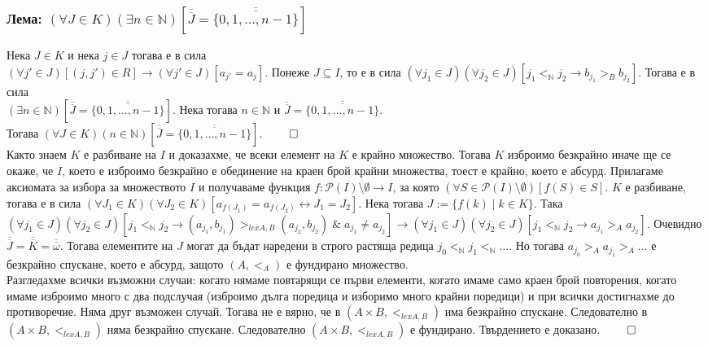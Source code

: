 \documentclass[a4paper, 12pt, oneside]{article}
\begin{document}
\subsubsection*{Лема: \((\forall J \in K)(\exists n \in \mathbb{N})[\overline{\overline{J}} = \overline{\overline{\{0, 1, \dots, n - 1\}}}]\)}
Нека \(J \in K\) и нека \(j \in J\) тогава е в сила \\
\((\forall j' \in J)[(j, j') \in R] \longrightarrow (\forall j' \in J)[a_{j'} = a_j]\).
Понеже \(J \subseteq I\), то е в сила \((\forall j_1 \in J)(\forall j_2 \in J)[j_1 <_{\mathbb{N}} j_2 \longrightarrow b_{j_1} >_B b_{j_2}]\). Тогава е в сила \\
\((\exists n \in \mathbb{N})[\overline{\overline{J}} = \overline{\overline{\{0, 1, \dots, n - 1\}}}]\).
Нека тогава \(n \in \mathbb{N}\) и \(\overline{\overline{J}} = \overline{\overline{\{0, 1, \dots, n - 1\}}}\). \\
Тогава \((\forall J \in K)(n \in \mathbb{N})[\overline{\overline{J}} = \overline{\overline{\{0, 1, \dots, n - 1\}}}]\). \(\qed\) \\
Както знаем \(K\) е разбиване на \(I\) и доказахме, че всеки елемент на \(K\) е крайно множество.
Тогава \(K\) изброимо безкрайно иначе ще се окаже, че \(I\), което е изброимо безкрайно е обединение на краен брой крайни множества, тоест е крайно, което е абсурд.
Прилагаме аксиомата за избора за множеството \(I\) и получаваме функция \(f : \mathcal{P}(I)\setminus\emptyset \to I\),
за която \((\forall S \in \mathcal{P}(I)\setminus\emptyset)[f(S) \in S]\).
\(K\) е разбиване, тогава е в сила \((\forall J_1 \in K)(\forall J_2 \in K)[a_{f(J_1)} = a_{f(J_2)} \longleftrightarrow J_1 = J_2]\).
Нека тогава \(J := \{f(k) \; | \; k \in K\}\).
Така \((\forall j_1 \in J)(\forall j_2 \in J)[j_1 <_{\mathbb{N}} j_2 \longrightarrow (a_{j_1}, b_{j_1}) >_{lex A, B} (a_{j_2}, b_{j_2}) \; \& \; a_{j_1} \neq a_{j_2}] \longrightarrow
(\forall j_1 \in J)(\forall j_2 \in J)[j_1 <_{\mathbb{N}} j_2 \longrightarrow a_{j_1} >_A a_{j_2}]\).
Очевидно \(\overline{\overline{J}} = \overline{\overline{K}} = \overline{\overline{\omega}}\).
Тогава елементите на \(J\) могат да бъдат наредени в строго растяща редица \(j_0 <_{\mathbb{N}} j_1  <_{\mathbb{N}} \dots\).
Но тогава \(a_{j_0} >_A a_{j_1} >_A \dots\) е безкрайно спускане, което е абсурд, защото \((A, <_A)\) е фундирано множество. \\
Разгледахме всички възможни случаи: когато нямаме повтарящи се първи елементи,
когато имаме само краен брой повторения,
когато имаме изброимо много с два подслучая
(изброимо дълга поредица и изборимо много крайни поредици)
и при всички достигнахме до противоречие. Няма друг възможен случай.
Тогава не е вярно, че в \((A \times B, <_{lex A, B})\) има безкрайно спускане. 
Следователно в \((A \times B, <_{lex A, B})\) няма безкрайно спускане.
Следователно \((A \times B, <_{lex A, B})\) е фундирано.
Твърдението е доказано. \(\qed\)
\end{document}
